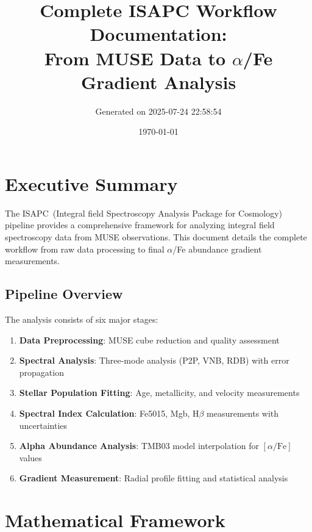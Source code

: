 \documentclass[12pt,a4paper]{article}
\title{Complete ISAPC Workflow Documentation: \\
       From MUSE Data to $\alpha$/Fe Gradient Analysis}
\author{Generated on 2025-07-24 22:58:54}
\date{\today}
\newcommand{\alphaFe}{[\alpha/\text{Fe}]}
\newcommand{\ISAPC}{\textsc{ISAPC}}
\begin{document}
\maketitle

\tableofcontents
\newpage

\section{Executive Summary}

The \ISAPC\ (Integral field Spectroscopy Analysis Package for Cosmology) pipeline provides a comprehensive framework for analyzing integral field spectroscopy data from MUSE observations. This document details the complete workflow from raw data processing to final $\alpha$/Fe abundance gradient measurements.

\subsection{Pipeline Overview}

The analysis consists of six major stages:
\begin{enumerate}
    \item \textbf{Data Preprocessing}: MUSE cube reduction and quality assessment
    \item \textbf{Spectral Analysis}: Three-mode analysis (P2P, VNB, RDB) with error propagation
    \item \textbf{Stellar Population Fitting}: Age, metallicity, and velocity measurements
    \item \textbf{Spectral Index Calculation}: Fe5015, Mgb, H$\beta$ measurements with uncertainties
    \item \textbf{Alpha Abundance Analysis}: TMB03 model interpolation for $\alphaFe$ values
    \item \textbf{Gradient Measurement}: Radial profile fitting and statistical analysis
\end{enumerate}

\section{Mathematical Framework}
\end{document}
